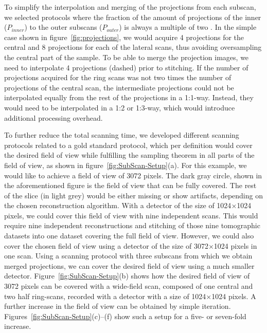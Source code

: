 To simplify the interpolation and merging of the projections from each subscan, we selected protocols where the fraction of the amount of projections of the inner ($P_{inner}$) to the outer subscans ($P_{outer}$) is always a multiple of two%
. In the simple case shown in figure~\ref{fig:projections}, we would acquire 4 projections for the central and 8 projections for each of the lateral scans, thus avoiding oversampling the central part of the sample. To be able to merge the projection images, we need to interpolate 4 projections (dashed) prior to stitching. If the number of projections acquired for the ring scans was not two times the number of projections of the central scan, the intermediate projections could not be interpolated equally from the rest of the projections in a 1:1-way. Instead, they would need to be interpolated in a 1:2 or 1:3-way, which would introduce additional processing overhead.

To further reduce the total scanning time, we developed different scanning protocols related to a gold standard protocol, which per definition would cover the desired field of view while fulfilling the sampling theorem in all parts of the field of view, as shown in figure~\ref{fig:SubScan-Setup}(a). For this example, we would like to achieve a field of view of 3072 pixels. The dark gray circle, shown in the aforementioned figure is the field of view that can be fully covered. The rest of the slice (in light grey) would be either missing or show artifacts, depending on the chosen reconstruction algorithm. With a detector of the size of 1024$\times$1024 pixels, we could cover this field of view with nine independent scans. This would require nine independent reconstructions and stitching of those nine tomographic datasets into one dataset covering the full field of view. However, we could also cover the chosen field of view using a detector of the size of 3072$\times$1024 pixels in one scan. Using a scanning protocol with three subscans from which we obtain merged projections, we can cover the desired field of view using a much smaller detector. Figure~\ref{fig:SubScan-Setup}(b) shows how the desired field of view of 3072 pixels can be covered with a wide-field scan, composed of one central and two half ring-scans, recorded with a detector with a size of 1024$\times$1024 pixels. A further increase in the field of view can be obtained by simple iteration. Figures~\ref{fig:SubScan-Setup}(c)--(f) show such a setup for a five- or seven-fold increase.

